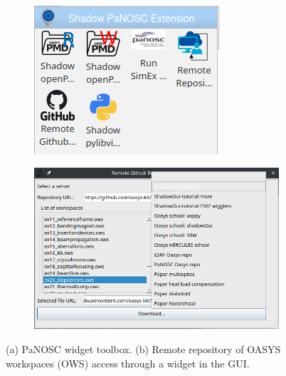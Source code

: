 \documentclass[11pt, a4paper]{article}
\begin{document}
\begin{figure}[htb]
    \centering
    \begin{subfigure}{0.3\textwidth}
        \includegraphics{figures/panosc_toolbox.png}
        \caption{}
        \label{fig:toolbox}
    \end{subfigure}
    \hfil
    \begin{subfigure}{0.5\textwidth}
        \includegraphics{figures/github_remote_access.png}
        \caption{}
        \label{fig:github_access}
    \end{subfigure}%
    \caption{(a) PaNOSC widget toolbox. (b) Remote repository of OASYS workspaces (OWS) access through a widget in the GUI.}
\end{figure}
\end{document}
